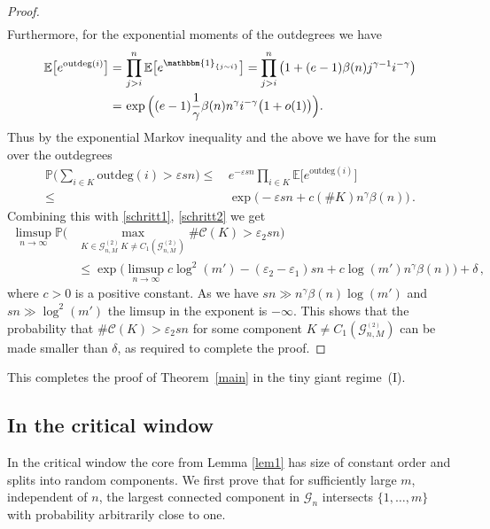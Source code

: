\documentclass[12pt,a4paper]{article}
\numberwithin{equation}{section}
\begin{document}
\begin{proof}
\begin{align}
\label{schritt2}
\end{align}
Furthermore, for the exponential moments of the outdegrees we have
\begin{align*}
     \mathbb{E}\big[e^{\text{outdeg}(i)}\big]=&\,\prod_{j>i}^n  \mathbb{E}\big[e^{ \mathbbm{1}_{\{j\sim i\}}}\big]=\prod_{j>i}^n  \big(1+(e-1)\beta(n)j^{\gamma-1} i^{-\gamma}\big)
      \\ =&\,\exp\Big((e-1)\frac{1}{\gamma}\beta(n)n^{\gamma} i^{-\gamma}\big(1+  o(1)\big) \Big).
\end{align*}
Thus by the exponential Markov inequality and the above 
we have for the sum over the outdegrees
\begin{align*}
   \mathbb P \Big(\sum_{i\in K} \text{outdeg}(i)>\varepsilon sn\Big)
     \le & \,e^{-\varepsilon sn}\prod_{i\in K}\mathbb E\big[e^{\text{outdeg}(i)}\big]
     \\ \le & \,\exp\big(-\varepsilon sn+ c(\#K)n^\gamma \beta(n)\big)\,.
\end{align*}
Combining this with \eqref{schritt1}, \eqref{schritt2} we get
\begin{align*}
    \limsup_{n\to\infty} \mathbb P \Big( & \max_{{K\in\mathcal{G}^{(2)}_{n,M}}\,{K\neq C_1(\mathcal{G}^{(2)}_{n,M})}}\#\mathcal C(K)>\varepsilon_2 sn\Big)
    \\  &  \le \exp\big( \limsup_{n\to\infty} c \log^2(m')-(\varepsilon_2-\varepsilon_1) sn+c\log(m')n^\gamma \beta(n)\big) +\delta\,,
\end{align*}
{where $c>0$ is a positive constant. As we have $sn\gg n^\gamma \beta(n)\log(m')$ and $sn\gg \log^2(m')$ the limsup in the exponent is $-\infty$. This shows that the probability that
$\#\mathcal C(K) > \varepsilon_2 s n$ for some component $K\not=C_1(\mathcal G^{_{(2)}}_{n,M})$ can be made smaller than $\delta$, as required to complete the proof.} 
\end{proof}

This completes the proof of Theorem~\ref{main} in the tiny giant regime~(I).

\subsection{In the critical window} \label{intermed}

In the critical window the core from Lemma \ref{lem1} has size of constant order and splits into random components. We first prove that for sufficiently large $m$, independent of $n$, the largest connected component in $\mathscr G_n$ intersects $\{1,\ldots,m\}$ with probability arbitrarily close to one.\smallskip
\end{document}
